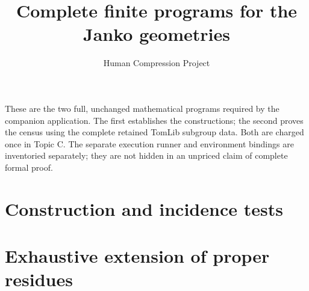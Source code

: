 
\title{Complete finite programs for the Janko geometries}
\author{Human Compression Project}
\date{}

\maketitle
These are the two full, unchanged mathematical programs required by
the companion application. The first establishes the constructions;
the second proves the census using the complete retained TomLib
subgroup data. Both are charged once in Topic C. The separate
execution runner and environment bindings are inventoried separately;
they are not hidden in an unpriced claim of complete formal proof.
\section{Construction and incidence tests}
\section{Exhaustive extension of proper residues}

